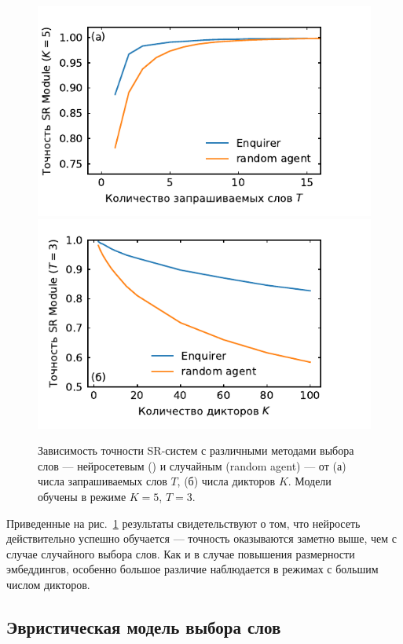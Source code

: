 \begin{figure}[H]
    \centering
    \includegraphics[scale=\pltscale]{../plots/word_sweep_enq.pdf}
    \includegraphics[scale=\pltscale]{../plots/guest_sweep_enq.pdf}
    \caption{Зависимость точности SR-систем с различными методами выбора слов
    --- нейросетевым (\enquirer{}) и случайным (random agent) --- от
    (а) числа запрашиваемых слов $T$, (б) числа дикторов $K$. Модели обучены в
    режиме $K = 5$, $T = 3$.}
    \label{fig:enquirer_test}
\end{figure}

Приведенные на рис.~\ref{fig:enquirer_test} результаты свидетельствуют о том, что
нейросеть действительно успешно обучается --- точность оказываются заметно выше,
чем с случае случайного выбора слов. Как и в случае повышения размерности
эмбеддингов, особенно большое различие наблюдается в режимах с большим числом
дикторов.

\subsection{Эвристическая модель выбора слов}

